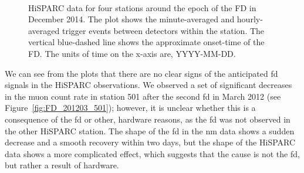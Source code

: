 \begin{figure}[ht]
	\centering
	 \\
	
	\qquad
	
	
	\caption{HiSPARC data for four stations around the epoch of the FD in December 2014. The plot shows the minute-averaged and hourly-averaged trigger events between detectors within the station. The vertical blue-dashed line shows the approximate onset-time of the FD. The units of time on the x-axis are, YYYY-MM-DD.}
	\label{fig:FD_201412}
\end{figure}


We can see from the plots that there are no clear signs of the anticipated \gls{fd} signals in the HiSPARC observations. We observed a set of significant decreases in the muon count rate in station 501 after the second \gls{fd} in March 2012 (see Figure~\ref{fig:FD_201203_501}); however, it is unclear whether this is a consequence of the \gls{fd} or other, hardware reasons, as the \gls{fd} was not observed in the other HiSPARC station. The shape of the \gls{fd} in the \gls{nm} data shows a sudden decrease and a smooth recovery within two days, but the shape of the HiSPARC data shows a more complicated effect, which suggests that the cause is not the \gls{fd}, but rather a result of hardware.

